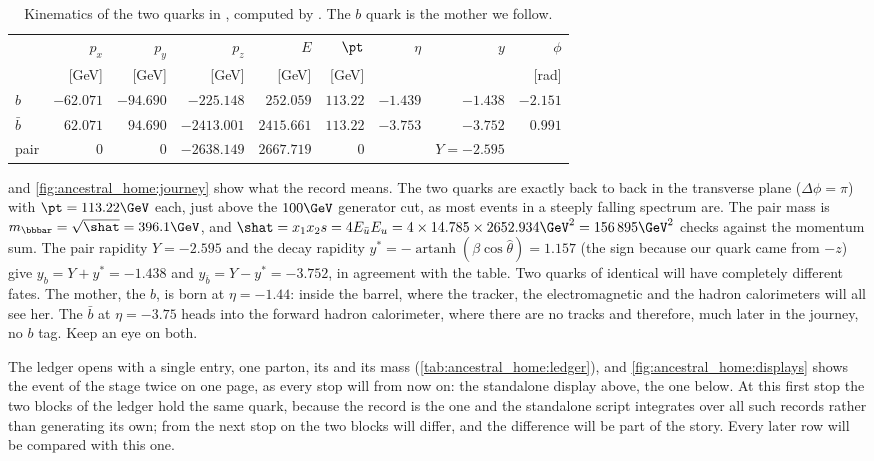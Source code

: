 \begin{table}[htbp]\centering
\caption[Kinematics of the two quarks of our event]{Kinematics of the two
quarks in , computed by .
The $b$ quark is the mother we follow.}
\label{tab:ancestral_home:kinematics}
\begin{tabular}{lrrrrrrrr}\toprule
 & $p_x$ & $p_y$ & $p_z$ & $E$ & $\pt$ & $\eta$ & $y$ & $\phi$ \\
 & [GeV] & [GeV] & [GeV] & [GeV] & [GeV] & & & [rad] \\ \midrule
$b$       & $-62.071$ & $-94.690$ & $-225.148$  & $252.059$  & $113.22$ & $-1.439$ & $-1.438$ & $-2.151$ \\
$\bar b$  & $62.071$  & $94.690$  & $-2413.001$ & $2415.661$ & $113.22$ & $-3.753$ & $-3.752$ & $0.991$ \\ \midrule
pair      & $0$ & $0$ & $-2638.149$ & $2667.719$ & $0$ & & $Y=-2.595$ & \\
\bottomrule
\end{tabular}
\end{table}

 and \cref{fig:ancestral_home:journey}
show what the record means. The two quarks are exactly back to back in the
transverse plane ($\Delta\phi=\pi$) with $\pt=113.22\GeV$ each, just above
the $100\GeV$ generator cut, as most events in a steeply falling spectrum
are. The pair mass is $m_{\bbbar}=\sqrt{\shat}=396.1\GeV$, and
$\shat=x_1x_2s=4E_{\bar u}E_u=4\times14.785\times2652.934\GeV^2=156\,895\GeV^2$
checks against the momentum sum. The pair rapidity $Y=-2.595$ and the decay
rapidity $y^{*}=-\operatorname{artanh}(\beta\cos\hat\theta)=1.157$ (the sign because our quark came from $-z$) give
$y_b=Y+y^{*}=-1.438$ and $y_{\bar b}=Y-y^{*}=-3.752$, in agreement with the
table. Two quarks of identical \pt will have completely different fates. The
mother, the $b$, is born at $\eta=-1.44$: inside the barrel, where the
tracker, the electromagnetic and the hadron calorimeters will all see her.
The $\bar b$ at $\eta=-3.75$ heads into the forward hadron calorimeter, where
there are no tracks and therefore, much later in the journey, no $b$ tag.
Keep an eye on both.

The ledger opens with a single entry, one parton, its \pt and its mass
(\cref{tab:ancestral_home:ledger}), and \cref{fig:ancestral_home:displays}
shows the event of the stage twice on one page, as every stop will from
now on: the standalone display above, the \CMSSW one below. At this first
stop the two blocks of the ledger hold the same quark, because the record
is the \CMSSW one and the standalone script integrates over all such
records rather than generating its own; from the next stop on the two
blocks will differ, and the difference will be part of the story. Every
later row will be compared with this one.

